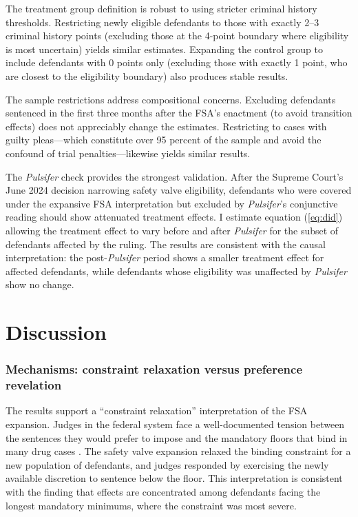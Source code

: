 \documentclass[12pt]{article}
\begin{document}
The treatment group definition is robust to using stricter criminal history thresholds. Restricting newly eligible defendants to those with exactly 2--3 criminal history points (excluding those at the 4-point boundary where eligibility is most uncertain) yields similar estimates. Expanding the control group to include defendants with 0 points only (excluding those with exactly 1 point, who are closest to the eligibility boundary) also produces stable results.

The sample restrictions address compositional concerns. Excluding defendants sentenced in the first three months after the FSA's enactment (to avoid transition effects) does not appreciably change the estimates. Restricting to cases with guilty pleas---which constitute over 95 percent of the sample and avoid the confound of trial penalties---likewise yields similar results.

The \textit{Pulsifer} check provides the strongest validation. After the Supreme Court's June 2024 decision narrowing safety valve eligibility, defendants who were covered under the expansive FSA interpretation but excluded by \textit{Pulsifer}'s conjunctive reading should show attenuated treatment effects. I estimate equation (\ref{eq:did}) allowing the treatment effect to vary before and after \textit{Pulsifer} for the subset of defendants affected by the ruling. The results are consistent with the causal interpretation: the post-\textit{Pulsifer} period shows a smaller treatment effect for affected defendants, while defendants whose eligibility was unaffected by \textit{Pulsifer} show no change.




\section{Discussion}

\subsubsection*{Mechanisms: constraint relaxation versus preference revelation}
The results support a ``constraint relaxation'' interpretation of the FSA expansion. Judges in the federal system face a well-documented tension between the sentences they would prefer to impose and the mandatory floors that bind in many drug cases \citep{yang2015free}. The safety valve expansion relaxed the binding constraint for a new population of defendants, and judges responded by exercising the newly available discretion to sentence below the floor. This interpretation is consistent with the finding that effects are concentrated among defendants facing the longest mandatory minimums, where the constraint was most severe.
\end{document}
